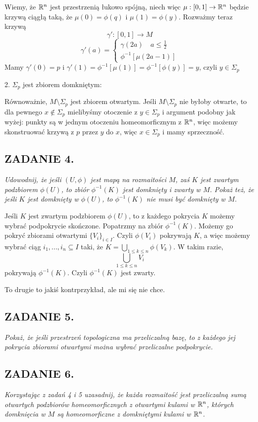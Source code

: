Wiemy, że $\mathbb{R}^n$ jest przestrzenią łukowo spójną, niech więc $\mu:[0,1]\to\mathbb{R}^n$ będzie krzywą ciągłą taką, że $\mu(0)=\phi(q)$ i $\mu(1)=\phi(y)$. Rozważmy teraz krzywą
$$\gamma':[0,1]\to M$$
$$\gamma'(a)=\begin{cases}
    \gamma(2a)\quad a\leq\frac12\\
    \phi^{-1}[\mu(2a-1)]
\end{cases}$$
Mamy $\gamma'(0)=p$ i $\gamma'(1)=\phi^{-1}[\mu(1)]=\phi^{-1}[\phi(y)]=y$, czyli $y\in \Sigma_p$

2. $\Sigma_p$ jest zbiorem domkniętym:

Równoważnie, $M\setminus\Sigma_p$ jest zbiorem otwartym. Jeśli $M\setminus\Sigma_p$ nie byłoby otwarte, to dla pewnego $x\notin\Sigma_p$ mielibyśmy otoczenie z $y\in \Sigma_p$ i argument podobny jak wyżej: punkty są w jednym otoczeniu homeomorficznym z $\mathbb{R}^n$, więc możemy skonstruować krzywą z $p$ przez $y$ do $x$, więc $x\in\Sigma_p$ i mamy sprzeczność.

\subsection*{ZADANIE 4.}
\emph{\color{pink}Udowodnij, że jeśli $(U,\phi)$ jest mapą na rozmaitości $M$, zaś $K$ jest zwartym podzbiorem $\phi(U)$, to zbiór $\phi^{-1}(K)$ jest domknięty i zwarty w $M$. Pokaż też, że jeśli $K$ jest domknięty w $\phi(U)$, to $\phi^{-1}(K)$ nie musi być domknięty w $M$.}
\medskip

Jeśli $K$ jest zwartym podzbiorem $\phi(U)$, to z każdego pokrycia $K$ możemy wybrać podpokrycie skończone. Popatrzmy na zbiór $\phi^{-1}(K)$. Możemy go pokryć zbiorami otwartymi $\{V_i\}_{i\in I}$. Czyli $\phi(V_i)$ pokrywają $K$, a więc możemy wybrać ciąg $i_1,...,i_n\subseteq I$ taki, że $K=\bigcup\limits_{1\leq k\leq n}\phi(V_k)$. W takim razie, 
$$\bigcup\limits_{1\leq k\leq n}V_i$$ 
pokrywają $\phi^{-1}(K)$. Czyli $\phi^{-1}(K)$ jest zwarty. 

To drugie to jakiś kontrprzykład, ale mi się nie chce.

\subsection*{ZADANIE 5.}
\emph{\color{yellow}Pokaż, że jeśli przestrzeń topologiczna ma przeliczalną bazę, to z każdego jej pokrycia zbiorami otwartymi można wybrać przeliczalne podpokrycie.}
\medskip

\subsection*{ZADANIE 6.}
\emph{\color{pink}Korzystając z zadań 4 i 5 uzasadnij, że każda rozmaitość jest przeliczalną sumą otwartych podzbiorów homeomorficznych z otwartymi kulami w $\mathbb{R}^n$, których domknięcia w $M$ są homeomorficzne z domkniętymi kulami w $\mathbb{R}^n$.}
\medskip

